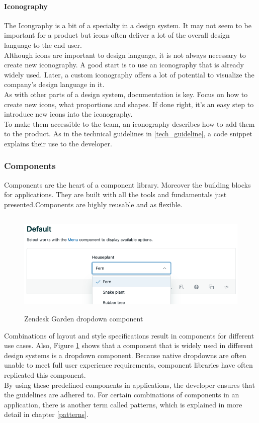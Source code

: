 \paragraph{Iconography}
The Icongraphy is a bit of a specialty in a design system. It may not seem to be important for a product but icons often deliver a lot of the overall design language to the end user. \\
Although icons are important to design language, it is not always necessary to create new iconography. A good start is to use an iconography that is already widely used. Later, a custom iconography offers a lot of potential to visualize the company's design language in it. \\
As with other parts of a design system, documentation is key. Focus on how to create new icons, what proportions and shapes. If done right, it's an easy step to introduce new icons into the iconography. 
\\
To make them accessible to the team, an iconography describes how to add them to the product. As in the technical guidelines in \ref{tech_guideline}, a code snippet explains their use to the developer. \cite{vesselov_building_2019}

\subsubsection{Components}
Components are the heart of a component library. Moreover the building blocks for applications. They are built with all the tools and fundamentals just presented.Components are highly reusable and as flexible.  \\
\begin{figure}[hbtp]
	\centerline{\includegraphics[height=5cm]{images/zendesk_component_example.png}}
	\caption{Zendesk Garden dropdown component \cite{zendesk_garden_zendesk_nodate}}
	\label{zen_garden_component}
\end{figure}

Combinations of layout and style specifications result in components for different use cases. Also, Figure \ref{zen_garden_component} shows that a component that is widely used in different design systems is a dropdown component. Because native dropdowns are often unable to meet full user experience requirements, component libraries have often replicated this component.\\
By using these predefined components in applications, the developer ensures that the guidelines are adhered to. For certain combinations of components in an application, there is another term called patterns, which is explained in more detail in chapter \ref{patterns}. \\

